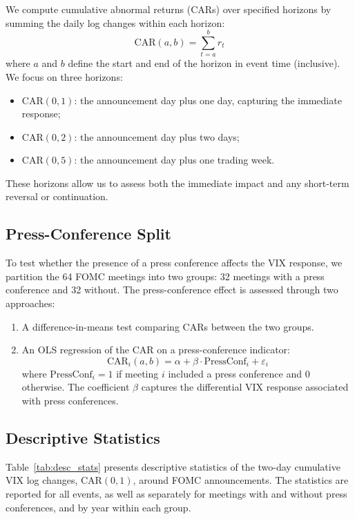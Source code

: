 We compute cumulative abnormal returns (CARs) over specified horizons by summing the daily log changes within each horizon:
\begin{equation}
    \text{CAR}(a, b) = \sum_{t=a}^{b} r_t
    \label{eq:car}
\end{equation}
where $a$ and $b$ define the start and end of the horizon in event time (inclusive). We focus on three horizons:
\begin{itemize}
    \item $\text{CAR}(0,1)$: the announcement day plus one day, capturing the immediate response;
    \item $\text{CAR}(0,2)$: the announcement day plus two days;
    \item $\text{CAR}(0,5)$: the announcement day plus one trading week.
\end{itemize}
These horizons allow us to assess both the immediate impact and any short-term reversal or continuation.

\subsection{Press-Conference Split}

To test whether the presence of a press conference affects the VIX response, we partition the 64 FOMC meetings into two groups: 32 meetings with a press conference and 32 without. The press-conference effect is assessed through two approaches:
\begin{enumerate}
    \item A difference-in-means test comparing CARs between the two groups.
    \item An OLS regression of the CAR on a press-conference indicator:
    \begin{equation}
        \text{CAR}_i(a,b) = \alpha + \beta \cdot \text{PressConf}_i + \varepsilon_i
        \label{eq:ols}
    \end{equation}
    where $\text{PressConf}_i = 1$ if meeting $i$ included a press conference and 0 otherwise. The coefficient $\beta$ captures the differential VIX response associated with press conferences.
\end{enumerate}

\subsection{Descriptive Statistics}

Table~\ref{tab:desc_stats} presents descriptive statistics of the two-day cumulative VIX log changes, $\text{CAR}(0,1)$, around FOMC announcements. The statistics are reported for all events, as well as separately for meetings with and without press conferences, and by year within each group.

